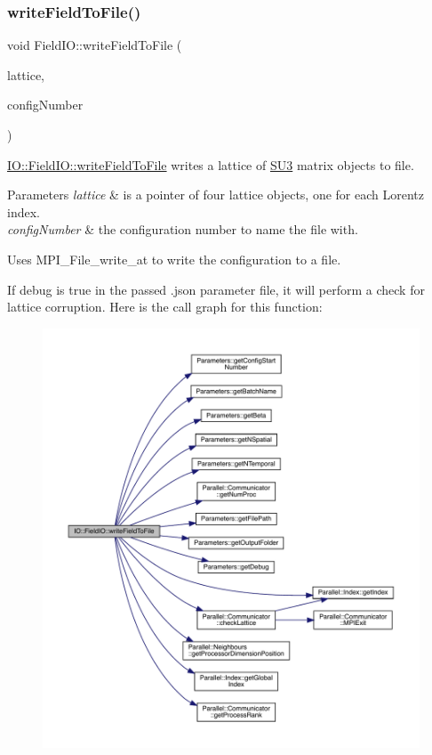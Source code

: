 \subsubsection{\texorpdfstring{writeFieldToFile()}{writeFieldToFile()}}
{\footnotesize\ttfamily void Field\+I\+O\+::write\+Field\+To\+File (\begin{DoxyParamCaption}\item[{\mbox{\hyperlink{class_lattice}{Lattice}}$<$ \mbox{\hyperlink{class_s_u3}{S\+U3}} $>$ $\ast$}]{lattice,  }\item[{unsigned int}]{config\+Number }\end{DoxyParamCaption})\hspace{0.3cm}{\ttfamily [static]}}



\mbox{\hyperlink{class_i_o_1_1_field_i_o_a8af607f9a1d79e90d4514c36103c6601}{I\+O\+::\+Field\+I\+O\+::write\+Field\+To\+File}} writes a lattice of \mbox{\hyperlink{class_s_u3}{S\+U3}} matrix objects to file. 


\begin{DoxyParams}{Parameters}
{\em lattice} & is a pointer of four lattice objects, one for each Lorentz index. \\
\hline
{\em config\+Number} & the configuration number to name the file with.\\
\hline
\end{DoxyParams}
Uses M\+P\+I\+\_\+\+File\+\_\+write\+\_\+at to write the configuration to a file.

If debug is true in the passed .json parameter file, it will perform a check for lattice corruption. Here is the call graph for this function\+:
\nopagebreak
\begin{figure}[H]
\begin{center}
\leavevmode
\includegraphics[width=350pt]{class_i_o_1_1_field_i_o_a8af607f9a1d79e90d4514c36103c6601_cgraph}
\end{center}
\end{figure}


